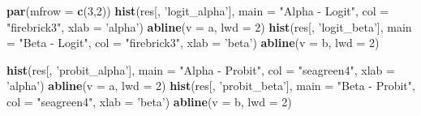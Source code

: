 \documentclass[]{article}
\newenvironment{Shaded}{\begin{snugshade}}{\end{snugshade}}
\newcommand{\DataTypeTok}[1]{\textcolor[rgb]{0.13,0.29,0.53}{#1}}
\newcommand{\DecValTok}[1]{\textcolor[rgb]{0.00,0.00,0.81}{#1}}
\newcommand{\KeywordTok}[1]{\textcolor[rgb]{0.13,0.29,0.53}{\textbf{#1}}}
\newcommand{\NormalTok}[1]{#1}
\newcommand{\OperatorTok}[1]{\textcolor[rgb]{0.81,0.36,0.00}{\textbf{#1}}}
\newcommand{\StringTok}[1]{\textcolor[rgb]{0.31,0.60,0.02}{#1}}
\begin{document}
\begin{Shaded}
\end{Shaded}

\begin{Shaded}
\begin{Highlighting}[]
\KeywordTok{par}\NormalTok{(}\DataTypeTok{mfrow =} \KeywordTok{c}\NormalTok{(}\DecValTok{3}\NormalTok{,}\DecValTok{2}\NormalTok{))}
\KeywordTok{hist}\NormalTok{(res[, }\StringTok{'logit_alpha'}\NormalTok{], }\DataTypeTok{main =} \StringTok{"Alpha - Logit"}\NormalTok{, }\DataTypeTok{col =} \StringTok{"firebrick3"}\NormalTok{, }\DataTypeTok{xlab =} \StringTok{'alpha'}\NormalTok{) }
\KeywordTok{abline}\NormalTok{(}\DataTypeTok{v =}\NormalTok{ a, }\DataTypeTok{lwd =} \DecValTok{2}\NormalTok{)}
\KeywordTok{hist}\NormalTok{(res[, }\StringTok{'logit_beta'}\NormalTok{], }\DataTypeTok{main =} \StringTok{"Beta - Logit"}\NormalTok{, }\DataTypeTok{col =} \StringTok{"firebrick3"}\NormalTok{, }\DataTypeTok{xlab =} \StringTok{'beta'}\NormalTok{) }
\KeywordTok{abline}\NormalTok{(}\DataTypeTok{v =}\NormalTok{ b, }\DataTypeTok{lwd =} \DecValTok{2}\NormalTok{)}

\KeywordTok{hist}\NormalTok{(res[, }\StringTok{'probit_alpha'}\NormalTok{], }\DataTypeTok{main =} \StringTok{"Alpha - Probit"}\NormalTok{, }\DataTypeTok{col =} \StringTok{"seagreen4"}\NormalTok{, }\DataTypeTok{xlab =} \StringTok{'alpha'}\NormalTok{) }
\KeywordTok{abline}\NormalTok{(}\DataTypeTok{v =}\NormalTok{ a, }\DataTypeTok{lwd =} \DecValTok{2}\NormalTok{)}
\KeywordTok{hist}\NormalTok{(res[, }\StringTok{'probit_beta'}\NormalTok{], }\DataTypeTok{main =} \StringTok{"Beta - Probit"}\NormalTok{, }\DataTypeTok{col =} \StringTok{"seagreen4"}\NormalTok{, }\DataTypeTok{xlab =} \StringTok{'beta'}\NormalTok{) }
\KeywordTok{abline}\NormalTok{(}\DataTypeTok{v =}\NormalTok{ b, }\DataTypeTok{lwd =} \DecValTok{2}\NormalTok{)}


\end{Highlighting}
\end{Shaded}
\end{document}
